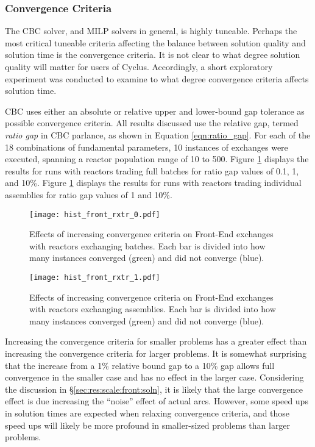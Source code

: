 \subsubsection{Convergence Criteria}

The CBC solver, and MILP solvers in general, is highly tuneable. Perhaps the
most critical tuneable criteria affecting the balance between solution quality
and solution time is the convergence criteria. It is not clear to what degree
solution quality will matter for users of Cyclus. Accordingly, a short
exploratory experiment was conducted to examine to what degree convergence
criteria affects solution time.

CBC uses either an absolute or relative upper and lower-bound gap tolerance as
possible convergence criteria. All results discussed use the relative gap,
termed \textit{ratio gap} in CBC parlance, as shown in Equation
\ref{eqn:ratio_gap}. For each of the 18 combinations of fundamental parameters,
10 instances of exchanges were executed, spanning a reactor population range of
10 to 500. Figure \ref{fig:hist_front_rxtr_0} displays the results for runs with
reactors trading full batches for ratio gap values of 0.1, 1, and 10\%. Figure
\ref{fig:hist_front_rxtr_0} displays the results for runs with reactors trading
individual assemblies for ratio gap values of 1 and 10\%.

\begin{figure}[h!]
  \begin{center}
    \texttt{[image: hist\_front\_rxtr\_0.pdf]}
    \caption{
      \label{fig:hist_front_rxtr_0}
      Effects of increasing convergence criteria on Front-End exchanges with
      reactors exchanging batches. Each bar is divided into how many instances
      converged (green) and did not converge (blue). }
  \end{center}
\end{figure}

\begin{figure}[h!]
  \begin{center}
    \texttt{[image: hist\_front\_rxtr\_1.pdf]}
    \caption{
      \label{fig:hist_front_rxtr_1}
      Effects of increasing convergence criteria on Front-End exchanges with
      reactors exchanging assemblies. Each bar is divided into how many instances
      converged (green) and did not converge (blue).}
  \end{center}
\end{figure}

Increasing the convergence criteria for smaller problems has a greater effect
than increasing the convergence criteria for larger problems. It is somewhat
surprising that the increase from a 1\% relative bound gap to a 10\% gap allows
full convergence in the smaller case and has no effect in the larger
case. Considering the discussion in \S \ref{sec:res:scale:front:soln}, it is
likely that the large convergence effect is due increasing the ``noise'' effect
of actual arcs. However, some speed ups in solution times are expected when
relaxing convergence criteria, and those speed ups will likely be more profound
in smaller-sized problems than larger problems.

